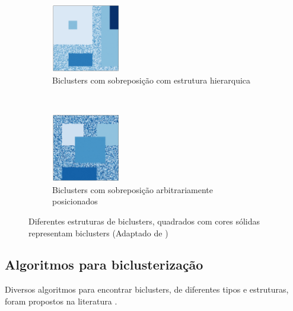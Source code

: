 \documentclass[normaltoc, espacoumemeio, pnumromarab,ruledheader]{abnt}
\begin{document}
\begin{figure}[h]
        ~
        \centering
        \begin{subfigure}[b]{0.3\textwidth}
                \includegraphics[width=30mm]{img/h-bic-struct.png}
                \caption{Biclusters com sobreposição com estrutura hierarquica}
                \label{fig:bicstruct-h}
        \end{subfigure}
        ~
        \centering
        \begin{subfigure}[b]{0.3\textwidth}
                \includegraphics[width=30mm]{img/i-bic-struct.png}
                \caption{Biclusters com sobreposição arbitrariamente posicionados}
                \label{fig:bicstruct-i}
        \end{subfigure}
        \caption{Diferentes estruturas de biclusters, quadrados com cores sólidas representam biclusters (Adaptado de \cite{Madeira2004})}
        \label{fig:bicstruct}
    \end{figure}
    
    \subsection{Algoritmos para biclusterização}

    Diversos algoritmos para encontrar biclusters, de diferentes tipos e estruturas, foram propostos na literatura \cite{Tanay2005,Madeira2004}.
    
\end{document}
